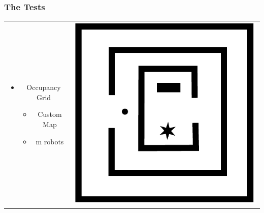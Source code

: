 \begin{frame}
\frametitle{The Tests}
\begin{tabular}{cc}
\hspace{-0.75cm}\begin{minipage}{0.5\textwidth}
\begin{itemize}
\item Occupancy Grid
\begin{itemize}
\item Custom Map
\item m robots
\end{itemize}
\end{itemize}
\end{minipage} & \hspace{-0.75cm}\begin{minipage}{0.6\textwidth}
\includegraphics[width=\textwidth]{../FiguresAndMovies/Test5}
\end{minipage}
\end{tabular}
\end{frame}

\begin{frame}
\frametitle{Validation}




\begin{center}
\href{run:../FiguresAndMovies/20150416T220508-gridmap-10.mp4}{\texttt{[image: \{\{../FiguresAndMovies/gridmap\_416-10]}}}}
\end{center}
\end{frame}